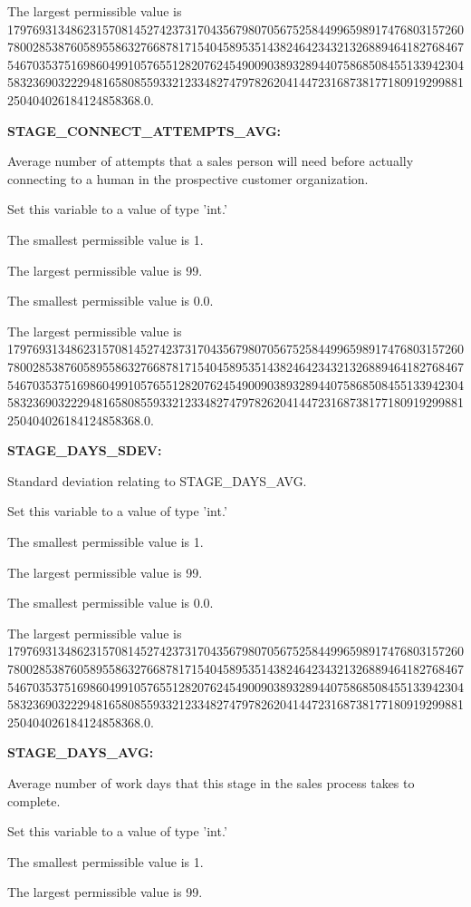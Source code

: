 The largest permissible value is 179769313486231570814527423731704356798070567525844996598917476803157260780028538760589558632766878171540458953514382464234321326889464182768467546703537516986049910576551282076245490090389328944075868508455133942304583236903222948165808559332123348274797826204144723168738177180919299881250404026184124858368.0.


\textbf{STAGE\_CONNECT\_ATTEMPTS\_AVG:}


Average number of attempts that a sales person will need before actually connecting to a human in the prospective customer organization.

Set this variable to a value of type 'int.'

The smallest permissible value is 1.

The largest permissible value is 99.

The smallest permissible value is 0.0.

The largest permissible value is 179769313486231570814527423731704356798070567525844996598917476803157260780028538760589558632766878171540458953514382464234321326889464182768467546703537516986049910576551282076245490090389328944075868508455133942304583236903222948165808559332123348274797826204144723168738177180919299881250404026184124858368.0.


\textbf{STAGE\_DAYS\_SDEV:}


Standard deviation relating to STAGE\_DAYS\_AVG.

Set this variable to a value of type 'int.'

The smallest permissible value is 1.

The largest permissible value is 99.

The smallest permissible value is 0.0.

The largest permissible value is 179769313486231570814527423731704356798070567525844996598917476803157260780028538760589558632766878171540458953514382464234321326889464182768467546703537516986049910576551282076245490090389328944075868508455133942304583236903222948165808559332123348274797826204144723168738177180919299881250404026184124858368.0.


\textbf{STAGE\_DAYS\_AVG:}


Average number of work days that this stage in the sales process takes to complete.

Set this variable to a value of type 'int.'

The smallest permissible value is 1.

The largest permissible value is 99.

